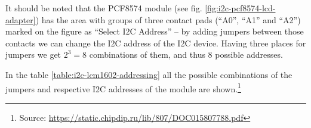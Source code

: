 \documentclass[../sparc.tex]{subfiles}
\begin{document}
It should be noted that the PCF8574 module (see
fig. \ref{fig:i2c-pcf8574-lcd-adapter}) has the area with groups of three
contact pads (``A0'', ``A1'' and ``A2'') marked on the figure as ``Select I2C
Address'' -- by adding jumpers between those contacts we can change the I2C
address of the I2C device.  Having three places for jumpers we get $2^3 = 8$
combinations of them, and thus 8 possible addresses.


In the table \ref{table:i2c-lcm1602-addressing} all the possible combinations of
the jumpers and respective I2C addresses of the module are
shown.\footnote{Source:
\url{https://static.chipdip.ru/lib/807/DOC015807788.pdf}}
\end{document}
